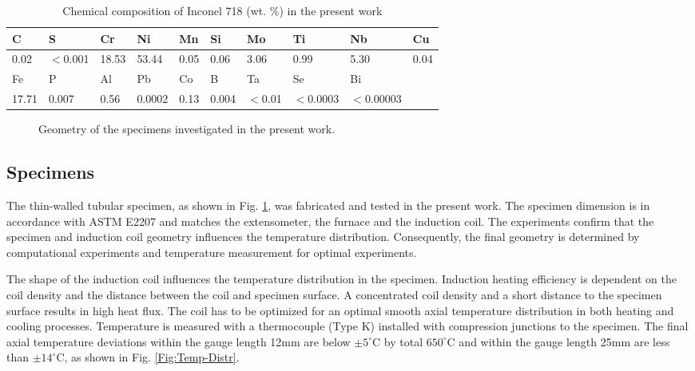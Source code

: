 \documentclass[preprint,5p,twocolumn,11pt,sort&compress]{elsarticle}
\newcommand{\marked}[1]{\textcolor{red}{#1}}
\begin{document}
\begin{table*}[htbp]
  \centering
  \caption{Chemical composition of Inconel 718 (wt. \%) in the present work}\vspace{0.1cm}
    \begin{tabular}{llllllllll}
    \hline
    C     & S     & Cr    & Ni    & Mn    & Si    & Mo    & Ti    & Nb    & Cu \\
    \hline
    0.02  & $<$0.001 & 18.53 & 53.44 & 0.05  & 0.06  & 3.06  & 0.99  & 5.30  & 0.04 \\
    \hline
    Fe    & P     & Al    & Pb    & Co    & B     & Ta    & Se    & Bi    &  \\
    \hline
    17.71 & 0.007 & 0.56  & 0.0002 & 0.13  & 0.004 & $<$0.01 & $<$0.0003 & $<$0.00003 &  \\
    \hline
    \end{tabular}%
  \label{Tab:ChemicalCompositionofIN718}%
\end{table*}%

\begin{figure}[htp]
\caption{Geometry of the specimens investigated in the present work.}
\label{Fig:Specimen}
\end{figure}

\subsection{Specimens}
The thin-walled tubular specimen, as shown in Fig. \ref{Fig:Specimen}, was fabricated and tested in the present work. The specimen dimension is in accordance with ASTM E2207 \cite{ASTM2014} and matches the extensometer, the furnace and the induction coil. The experiments confirm that the specimen and induction coil geometry influences the temperature distribution. Consequently, the final geometry is determined by computational experiments and temperature measurement for optimal experiments.

The shape of the induction coil influences the temperature distribution in the specimen. Induction heating efficiency is dependent on the coil density and the distance between the coil and specimen surface. A concentrated coil density and a short distance to the specimen surface results in high heat flux. The coil has to be optimized for an optimal smooth axial temperature distribution in both heating and cooling processes. Temperature is measured with a thermocouple (Type K) installed with compression junctions to the specimen. The final axial temperature deviations within the gauge length 12mm are below $\pm5^\circ$C by total $650^\circ$C and within the gauge length 25mm are less than $\pm14^\circ$C, as shown in Fig. \ref{Fig:Temp-Distr}.
\end{document}
